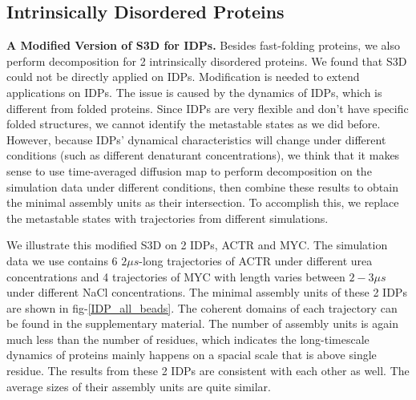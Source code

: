 \documentclass[journal=jacsat,manuscript=article]{achemso}
\begin{document}
\subsection{Intrinsically Disordered Proteins}

{\bf A Modified Version of S3D for IDPs.} Besides fast-folding proteins, we also perform decomposition for 2 intrinsically disordered proteins. We found that S3D could not be directly applied on IDPs. Modification is needed to extend applications on IDPs. The issue is caused by the dynamics of IDPs, which is different from folded proteins. Since IDPs are very flexible and don't have specific folded structures\cite{IDP,IDP_TOMPA}, we cannot identify the metastable states as we did before\cite{IDP_dynamics}. However, because IDPs' dynamical characteristics will change under different conditions (such as different denaturant concentrations), we think that it makes sense to use time-averaged diffusion map\cite{Lrenzo_S3D} to perform decomposition on the simulation data under different conditions, then combine these results to obtain the minimal assembly units as their intersection. To accomplish this, we replace the metastable states with trajectories from different simulations.

We illustrate this modified S3D on 2 IDPs, ACTR and MYC. The simulation data we use contains 6 $2\mu s$-long trajectories of ACTR under different urea concentrations\cite{ACTR} and 4 trajectories of MYC with length varies between $2-3\mu s$ under different NaCl concentrations\cite{MYC}. The minimal assembly units of these 2 IDPs are shown in fig-\ref{IDP_all_beads}. The coherent domains of each trajectory can be found in the supplementary material. The number of assembly units is again much less than the number of residues, which indicates the long-timescale dynamics of proteins mainly happens on a spacial scale that is above single residue. The results from these 2 IDPs are consistent with each other as well. The average sizes of their assembly units are quite similar.
\end{document}

